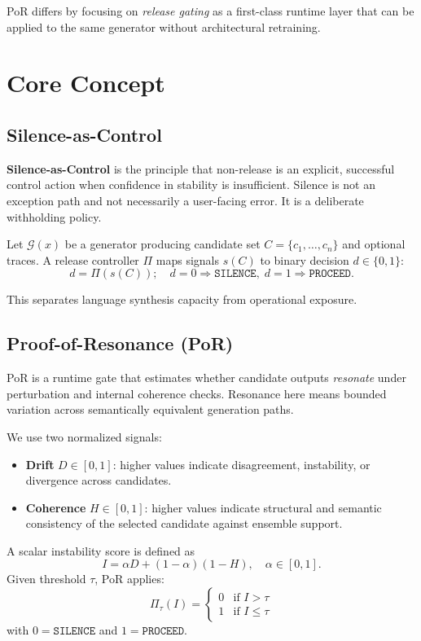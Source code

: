 \documentclass[11pt]{article}
\begin{document}
PoR differs by focusing on \emph{release gating} as a first-class runtime layer that can be applied to the same generator without architectural retraining.

\section{Core Concept}
\subsection{Silence-as-Control}
\textbf{Silence-as-Control} is the principle that non-release is an explicit, successful control action when confidence in stability is insufficient. Silence is not an exception path and not necessarily a user-facing error. It is a deliberate withholding policy.

Let $\mathcal{G}(x)$ be a generator producing candidate set $C = \{c_1,\dots,c_n\}$ and optional traces. A release controller $\Pi$ maps signals $s(C)$ to binary decision $d \in \{0,1\}$:
\begin{equation}
 d = \Pi(s(C)); \quad d=0 \Rightarrow \texttt{SILENCE}, \; d=1 \Rightarrow \texttt{PROCEED}.
\end{equation}

This separates language synthesis capacity from operational exposure.

\subsection{Proof-of-Resonance (PoR)}
PoR is a runtime gate that estimates whether candidate outputs \emph{resonate} under perturbation and internal coherence checks. Resonance here means bounded variation across semantically equivalent generation paths.

We use two normalized signals:
\begin{itemize}[leftmargin=1.5em]
    \item \textbf{Drift} $D \in [0,1]$: higher values indicate disagreement, instability, or divergence across candidates.
    \item \textbf{Coherence} $H \in [0,1]$: higher values indicate structural and semantic consistency of the selected candidate against ensemble support.
\end{itemize}

A scalar instability score is defined as
\begin{equation}
I = \alpha D + (1-\alpha)(1-H), \quad \alpha \in [0,1].
\end{equation}
Given threshold $\tau$, PoR applies:
\begin{equation}
\Pi_{\tau}(I)=
\begin{cases}
0 & \text{if } I > \tau\\
1 & \text{if } I \le \tau
\end{cases}
\label{eq:rule}
\end{equation}
with $0=\texttt{SILENCE}$ and $1=\texttt{PROCEED}$.
\end{document}
